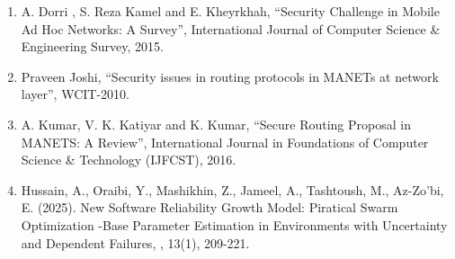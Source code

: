 \documentclass[10pt]{NSP1}
\begin{document}
\begin{enumerate}
  \item A. Dorri , S. Reza Kamel and E. Kheyrkhah, “Security Challenge in Mobile Ad Hoc Networks: A Survey”, International Journal of Computer Science \& Engineering Survey, 2015.
  \item Praveen Joshi, “Security issues in routing protocols in MANETs at network layer”, WCIT-2010.
  \item A. Kumar, V. K. Katiyar and K. Kumar, “Secure Routing Proposal in MANETS: A Review”, International Journal in Foundations of Computer Science \& Technology (IJFCST), 2016.
  \item Hussain, A., Oraibi, Y., Mashikhin, Z., Jameel, A., Tashtoush, M., Az-Zo’bi, E. (2025). New Software Reliability Growth Model: Piratical Swarm Optimization -Base Parameter Estimation in Environments with Uncertainty and Dependent Failures, , 13(1), 209-221.
\end{enumerate}
\end{document}
